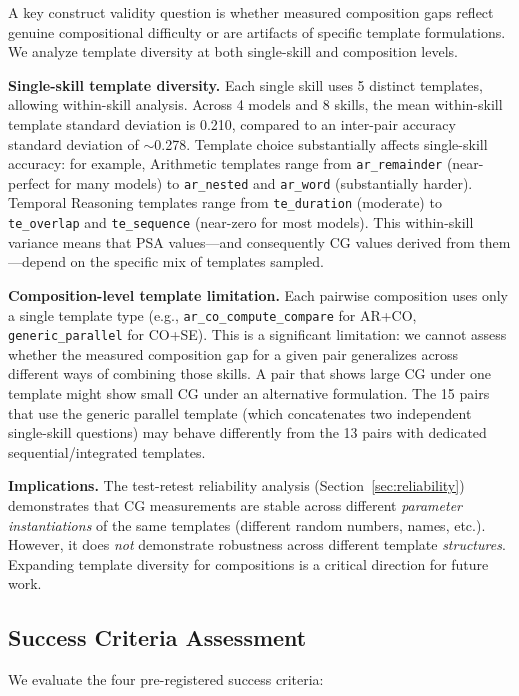 \documentclass{article}
\begin{document}
A key construct validity question is whether measured composition gaps reflect genuine compositional difficulty or are artifacts of specific template formulations. We analyze template diversity at both single-skill and composition levels.

\textbf{Single-skill template diversity.} Each single skill uses 5 distinct templates, allowing within-skill analysis. Across 4 models and 8 skills, the mean within-skill template standard deviation is 0.210, compared to an inter-pair accuracy standard deviation of $\sim$0.278. Template choice substantially affects single-skill accuracy: for example, Arithmetic templates range from \texttt{ar\_remainder} (near-perfect for many models) to \texttt{ar\_nested} and \texttt{ar\_word} (substantially harder). Temporal Reasoning templates range from \texttt{te\_duration} (moderate) to \texttt{te\_overlap} and \texttt{te\_sequence} (near-zero for most models). This within-skill variance means that PSA values---and consequently CG values derived from them---depend on the specific mix of templates sampled.

\textbf{Composition-level template limitation.} Each pairwise composition uses only a single template type (e.g., \texttt{ar\_co\_compute\_compare} for AR+CO, \texttt{generic\_parallel} for CO+SE). This is a significant limitation: we cannot assess whether the measured composition gap for a given pair generalizes across different ways of combining those skills. A pair that shows large CG under one template might show small CG under an alternative formulation. The 15 pairs that use the generic parallel template (which concatenates two independent single-skill questions) may behave differently from the 13 pairs with dedicated sequential/integrated templates.

\textbf{Implications.} The test-retest reliability analysis (Section~\ref{sec:reliability}) demonstrates that CG measurements are stable across different \emph{parameter instantiations} of the same templates (different random numbers, names, etc.). However, it does \emph{not} demonstrate robustness across different template \emph{structures}. Expanding template diversity for compositions is a critical direction for future work.

\subsection{Success Criteria Assessment}

We evaluate the four pre-registered success criteria:
\end{document}

